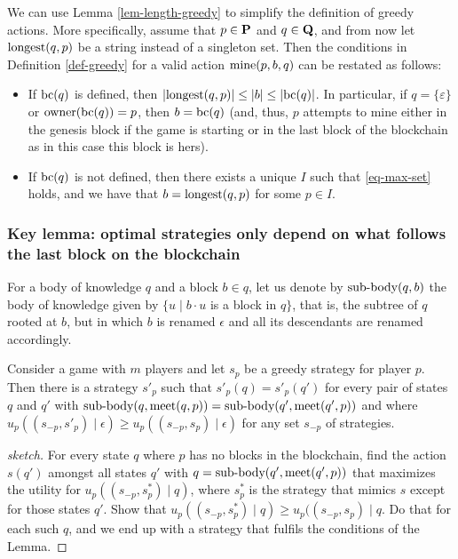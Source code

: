 We can use Lemma \ref{lem-length-greedy} to simplify the definition of greedy actions. More specifically, assume that $p \in \mathbf{P}$ and $q \in \mathbf{Q}$, and from now let ${\text{\rm longest}}(q,p)$ be a string instead of a singleton set. Then the conditions in Definition \ref{def-greedy} for a valid action $\text{\rm mine}(p,b,q)$ can be restated as follows:
\begin{itemize}
\item If $\text{bc}(q)$ is defined, then $|{\text{\rm longest}}(q,p)| \leq |b|  \leq |\text{bc}(q)|$. In particular, 
if $q = \{\varepsilon\}$ or $\text{\rm owner}(\text{bc}(q)) = p$, then $b = \text{bc}(q)$ (and, thus, $p$ attempts to mine either in the genesis block if the game is starting or in the last block of the blockchain as in this case this block is hers).



\item If $\text{bc}(q)$ is not defined, then there exists a unique $I$ such that \eqref{eq-max-set} holds, and we have that $b = {\text{\rm longest}}(q,p)$ for some $p \in I$.
\end{itemize}



\subsubsection{Key lemma: optimal strategies only depend on what follows the last block on the blockchain}

For a body of knowledge $q$ and a block $b \in q$, let us denote by ${\text{\rm sub-body}}(q,b)$ the body of knowledge 
given by $\{u \mid b\cdot u$ is a block in $q\}$, that is, the subtree of $q$ rooted at $b$, but in which $b$ is renamed 
$\epsilon$ and all its descendants are renamed accordingly. 

\begin{mylem}
\label{lem-meet}
Consider a game with $m$ players and let $s_p$ be a greedy strategy for player $p$. Then there is a strategy $s'_p$ such that $s'_p(q) = s'_p(q')$ 
for every pair of states $q$ and $q'$ with ${\text{\rm sub-body}}(q,\text{\rm meet}(q,p)) = {\text{\rm sub-body}}(q',\text{\rm meet}(q',p))$ and where 
$u_p((s_{-p},s'_p) \mid \epsilon) \geq u_p((s_{-p},s_p) \mid \epsilon)$ for any set $s_{-p}$ of strategies. 
\end{mylem}
\begin{proof}[sketch]
For every state $q$ where $p$ has no blocks in the blockchain, find the action $s(q')$ amongst all states $q'$ with 
$q = {\text{\rm sub-body}}(q',\text{\rm meet}(q',p))$ that maximizes the utility for $u_p((s_{-p},s^*_p) \mid q)$, where $s^*_p$ is the strategy that mimics 
$s$ except for those states $q'$. Show that $u_p((s_{-p},s^*_p) \mid q) \geq u_p((s_{-p},s_p) \mid q$. Do that for each such $q$, 
and we end up with a strategy that fulfils the conditions of the Lemma. 
\end{proof}

